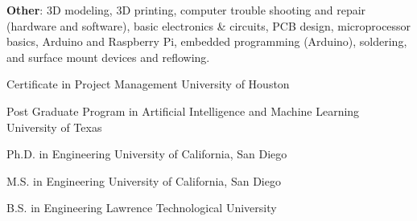 \documentclass{leresume}
\begin{document}
\begin{bulletedlist}
		\item \textbf{Other}: 3D modeling,
                        3D printing,
                        computer trouble shooting and repair (hardware and software),
                        basic electronics \& circuits,
                        PCB design,
                        microprocessor basics,
                        Arduino and Raspberry Pi,
                        embedded programming (Arduino),
                        soldering,
                        and surface mount devices and reflowing.
                        
	\end{bulletedlist}

	
                {Certificate in Project Management}
                {University of Houston}
		
                {Post Graduate Program in Artificial Intelligence and Machine Learning}
                {University of Texas}
		
                {Ph.D. in Engineering}
                {University of California, San Diego}
		
                {M.S. in Engineering}
                {University of California, San Diego}
		
                {B.S. in Engineering}
                {Lawrence Technological University}
		

    
\end{document}
